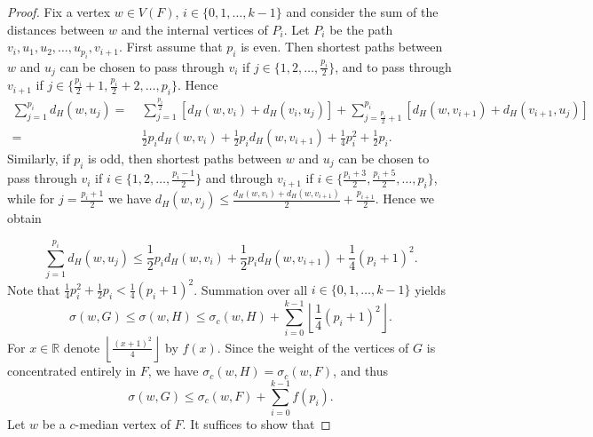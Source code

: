 \documentclass[a4paper,11pt]{article}
\numberwithin{equation}{theorem}
\begin{document}
\begin{proof}
Fix a vertex $w \in V(F)$, $i \in \{0,1,\ldots,k-1\}$ and consider the sum of the distances between $w$ and the internal vertices of $P_i$. Let $P_i$ be the path $v_i, u_1, u_2,\ldots,u_{p_i},v_{i+1}$. First assume that $p_i$ is even. Then shortest paths between $w$ and $u_j$ can be chosen to pass through $v_i$ if $j \in \{1,2,\ldots,\frac{p_i}{2}\}$, and to pass through $v_{i+1}$ if $j \in \{\frac{p_i}{2}+1, \frac{p_i}{2}+2,\ldots,p_i\}$. Hence
\begin{align*}
\sum_{j=1}^{p_i} d_H(w,u_j)
 =& \; \sum_{j=1}^{\frac{p_i}{2}} [d_{H}(w,v_i) + d_{H}(v_i,u_j) ]
  + \sum_{j=\frac{p_i}{2}+1}^{p_i} [d_H(w,v_{i+1}) + d_H(v_{i+1},u_j) ] \\
  =& \; \frac{1}{2}p_i d_H(w,v_i) 
    + \frac{1}{2}p_i d_H(w,v_{i+1})
  + \frac{1}{4}p_i^2 + \frac{1}{2}p_i.
\end{align*}
Similarly, if $p_i$ is odd, then shortest paths between $w$ and $u_j$ can be chosen to pass through $v_i$ if $i \in \{1,2, \ldots, \frac{p_i-1}{2} \}$
and  through $v_{i+1}$ if $i \in \{ \frac{p_i+3}{2}, \frac{p_i+5}{2}, \ldots, p_i \}$, while for 
$j=\frac{p_i+1}{2}$ we have 
$d_H(w,v_j) \leq \frac{d_H(w,v_i) + d_H(w,v_{i+1})}{2} + \frac{p_{i+1}}{2}$. Hence we obtain

\[ 
 \sum_{j=1}^{p_i} d_H(w,u_j)
 \leq \frac{1}{2}p_i d_H(w,v_i) 
    + \frac{1}{2}p_i d_H(w,v_{i+1})
  + \frac{1}{4}(p_i+1)^2.\]  
Note that $\frac{1}{4}p_i^2 + \frac{1}{2}p_i < \frac{1}{4}(p_i+1)^2$. 
Summation over all $i \in \{0,1,\ldots,k-1\}$ yields
\begin{equation} \label{eq:sigma(w)-vs-sigma_c(w)}
\sigma(w,G) \leq \sigma(w,H) \leq \sigma_c(w,H) + \sum^{k-1}_{i=0} \left\lfloor\dfrac{1}{4}(p_i+1)^2 \right\rfloor. 
\end{equation}
For $x \in \mathbb{R}$ denote 
$\left\lfloor \frac{(x+1)^2}{4} \right\rfloor$ by $f(x)$. Since the weight of the vertices of $G$ is concentrated entirely in $F$, we have $\sigma_c(w,H) = \sigma_c(w,F)$, and thus 
\[ \sigma(w,G) \leq \sigma_c(w,F) 
     + \sum_{i=0}^{k-1} f(p_i). \]
Let $w$ be a $c$-median vertex of $F$. It suffices to show that 


\end{proof}
\end{document}
